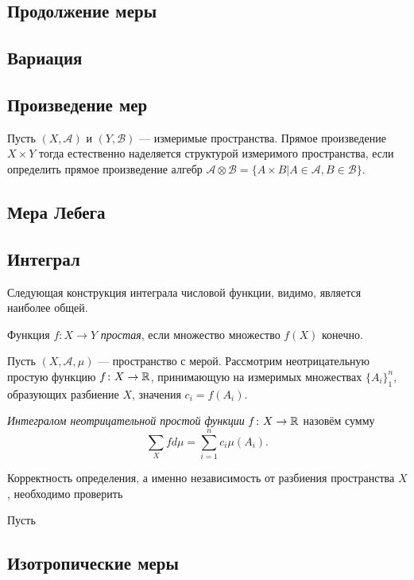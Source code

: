 \subsection{Продолжение меры}

\subsection{Вариация}

\subsection{Произведение мер}
Пусть $(X,\mathcal{A})$ и $(Y,\mathcal{B})$ --- измеримые пространства. Прямое произведение $X\times Y$ тогда естественно наделяется структурой измеримого пространства, если определить прямое произведение алгебр $\mathcal{A}\otimes\mathcal{B}=\{A\times B|A\in\mathcal{A},B\in\mathcal{B}\}$.

\subsection{Мера Лебега}

\subsection{Интеграл}
Следующая конструкция интеграла числовой функции, видимо, является наиболее общей.
\begin{defin}
	Функция $f\colon X\to Y$ \textit{простая}, если множество множество $f(X)$ конечно.
\end{defin}
Пусть $(X,\mathcal{A},\mu)$ --- пространство с мерой. Рассмотрим неотрицательную простую функцию $f\colon X\to\mathbb {R}$, принимающую на измеримых множествах $\{A_i\}_1^n$, образующих разбиение $X$, значения $c_i=f(A_i)$.
\begin{defin}
	\textit{Интегралом неотрицательной простой функции} $f\colon X\to\mathbb {R}$ назовём сумму
	\begin{equation}
		\sum_X fd\mu=\sum_{i=1}^n c_i\mu(A_i).
	\end{equation}
\end{defin}
Корректность определения, а именно независимость от разбиения пространства $X$, необходимо проверить
\begin{prop}
	
\end{prop}
\begin{defin}
	Пусть
\end{defin}

\subsection{Изотропические меры}
